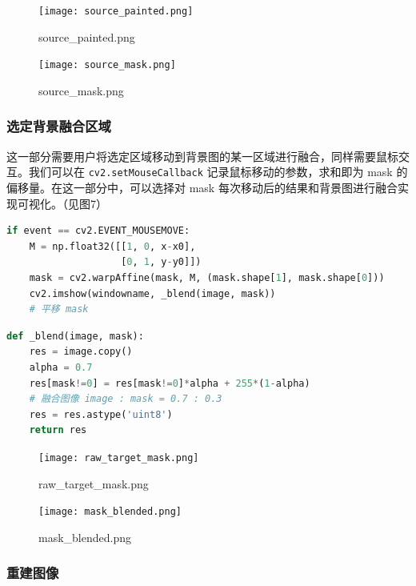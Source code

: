 \documentclass[lang=cn,11pt,a4paper]{elegantpaper}
\begin{document}
\begin{figure}[ht]
	\begin{minipage}{0.5\linewidth}
		\centering
		\texttt{[image: source\_painted.png]}
		\caption{source\_painted.png}
	\end{minipage}%
	\begin{minipage}{0.5\linewidth}
		\centering
		\texttt{[image: source\_mask.png]}
		\caption{source\_mask.png}
	\end{minipage}
\end{figure}

\subsubsection{选定背景融合区域}

这一部分需要用户将选定区域移动到背景图的某一区域进行融合，同样需要鼠标交互。我们可以在 \lstinline{cv2.setMouseCallback} 记录鼠标移动的参数，求和即为 mask 的偏移量。在这一部分中，可以选择对 mask 每次移动后的结果和背景图进行融合实现可视化。（见图7）

\begin{lstlisting}[language=Python]
if event == cv2.EVENT_MOUSEMOVE:
    M = np.float32([[1, 0, x-x0],
                    [0, 1, y-y0]])
    mask = cv2.warpAffine(mask, M, (mask.shape[1], mask.shape[0]))
    cv2.imshow(windowname, _blend(image, mask))
    # 平移 mask
\end{lstlisting}
\begin{lstlisting}[language=Python]
def _blend(image, mask):
    res = image.copy()
    alpha = 0.7
    res[mask!=0] = res[mask!=0]*alpha + 255*(1-alpha)
    # 融合图像 image : mask = 0.7 : 0.3 
    res = res.astype('uint8')
    return res
\end{lstlisting}


\begin{figure}[ht]
	\begin{minipage}{0.5\linewidth}
		\centering
		\texttt{[image: raw\_target\_mask.png]}
		\caption{raw\_target\_mask.png}
	\end{minipage}%
	\begin{minipage}{0.5\linewidth}
		\centering
		\texttt{[image: mask\_blended.png]}
		\caption{mask\_blended.png}
	\end{minipage}
\end{figure}



\subsubsection{重建图像}
\end{document}
